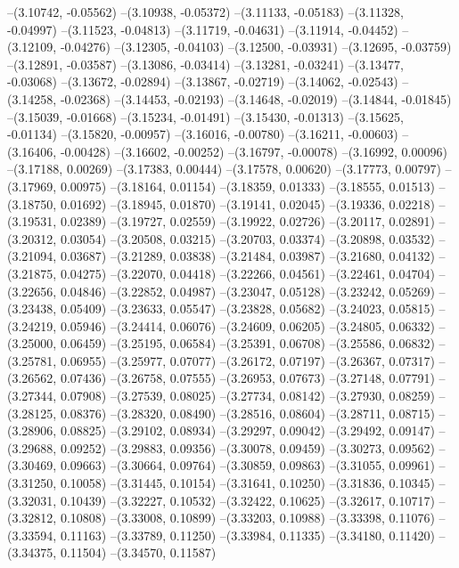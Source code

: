 --(3.10742, -0.05562)
--(3.10938, -0.05372)
--(3.11133, -0.05183)
--(3.11328, -0.04997)
--(3.11523, -0.04813)
--(3.11719, -0.04631)
--(3.11914, -0.04452)
--(3.12109, -0.04276)
--(3.12305, -0.04103)
--(3.12500, -0.03931)
--(3.12695, -0.03759)
--(3.12891, -0.03587)
--(3.13086, -0.03414)
--(3.13281, -0.03241)
--(3.13477, -0.03068)
--(3.13672, -0.02894)
--(3.13867, -0.02719)
--(3.14062, -0.02543)
--(3.14258, -0.02368)
--(3.14453, -0.02193)
--(3.14648, -0.02019)
--(3.14844, -0.01845)
--(3.15039, -0.01668)
--(3.15234, -0.01491)
--(3.15430, -0.01313)
--(3.15625, -0.01134)
--(3.15820, -0.00957)
--(3.16016, -0.00780)
--(3.16211, -0.00603)
--(3.16406, -0.00428)
--(3.16602, -0.00252)
--(3.16797, -0.00078)
--(3.16992, 0.00096)
--(3.17188, 0.00269)
--(3.17383, 0.00444)
--(3.17578, 0.00620)
--(3.17773, 0.00797)
--(3.17969, 0.00975)
--(3.18164, 0.01154)
--(3.18359, 0.01333)
--(3.18555, 0.01513)
--(3.18750, 0.01692)
--(3.18945, 0.01870)
--(3.19141, 0.02045)
--(3.19336, 0.02218)
--(3.19531, 0.02389)
--(3.19727, 0.02559)
--(3.19922, 0.02726)
--(3.20117, 0.02891)
--(3.20312, 0.03054)
--(3.20508, 0.03215)
--(3.20703, 0.03374)
--(3.20898, 0.03532)
--(3.21094, 0.03687)
--(3.21289, 0.03838)
--(3.21484, 0.03987)
--(3.21680, 0.04132)
--(3.21875, 0.04275)
--(3.22070, 0.04418)
--(3.22266, 0.04561)
--(3.22461, 0.04704)
--(3.22656, 0.04846)
--(3.22852, 0.04987)
--(3.23047, 0.05128)
--(3.23242, 0.05269)
--(3.23438, 0.05409)
--(3.23633, 0.05547)
--(3.23828, 0.05682)
--(3.24023, 0.05815)
--(3.24219, 0.05946)
--(3.24414, 0.06076)
--(3.24609, 0.06205)
--(3.24805, 0.06332)
--(3.25000, 0.06459)
--(3.25195, 0.06584)
--(3.25391, 0.06708)
--(3.25586, 0.06832)
--(3.25781, 0.06955)
--(3.25977, 0.07077)
--(3.26172, 0.07197)
--(3.26367, 0.07317)
--(3.26562, 0.07436)
--(3.26758, 0.07555)
--(3.26953, 0.07673)
--(3.27148, 0.07791)
--(3.27344, 0.07908)
--(3.27539, 0.08025)
--(3.27734, 0.08142)
--(3.27930, 0.08259)
--(3.28125, 0.08376)
--(3.28320, 0.08490)
--(3.28516, 0.08604)
--(3.28711, 0.08715)
--(3.28906, 0.08825)
--(3.29102, 0.08934)
--(3.29297, 0.09042)
--(3.29492, 0.09147)
--(3.29688, 0.09252)
--(3.29883, 0.09356)
--(3.30078, 0.09459)
--(3.30273, 0.09562)
--(3.30469, 0.09663)
--(3.30664, 0.09764)
--(3.30859, 0.09863)
--(3.31055, 0.09961)
--(3.31250, 0.10058)
--(3.31445, 0.10154)
--(3.31641, 0.10250)
--(3.31836, 0.10345)
--(3.32031, 0.10439)
--(3.32227, 0.10532)
--(3.32422, 0.10625)
--(3.32617, 0.10717)
--(3.32812, 0.10808)
--(3.33008, 0.10899)
--(3.33203, 0.10988)
--(3.33398, 0.11076)
--(3.33594, 0.11163)
--(3.33789, 0.11250)
--(3.33984, 0.11335)
--(3.34180, 0.11420)
--(3.34375, 0.11504)
--(3.34570, 0.11587)
